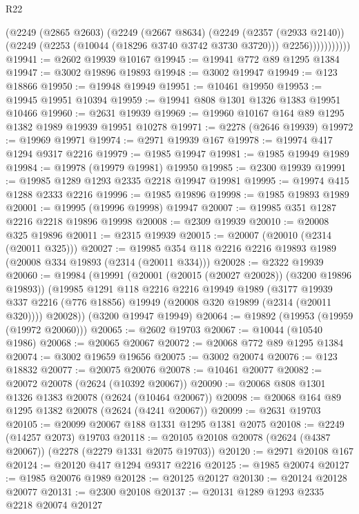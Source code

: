 \begin{lexlean}{R22}
\begin{coremodule}
                  (@2249
                    (@2865 @2603)
                    (@2249
                      (@2667 @8634)
                      (@2249
                        (@2357 (@2933 @2140))
                        (@2249 (@2253 (@10044 (@18296 @3740 @3742 @3730 @3720))) @2256)))))))))))
@19941 := @2602 @19939 @10167
@19945 := @19941 @772 @89 @1295 @1384
@19947 := @3002 @19896 @19893
@19948 := @3002 @19947
@19949 := @123 @18866
@19950 := @19948 @19949
@19951 := @10461 @19950
@19953 := @19945 @19951 @10394
@19959 := @19941 @808 @1301 @1326 @1383 @19951 @10466
@19960 := @2631 @19939
@19969 := @19960 @10167 @164 @89 @1295 @1382 @1989 @19939 @19951 @10278
@19971 := @2278 (@2646 @19939)
@19972 := @19969 @19971
@19974 := @2971 @19939 @167
@19978 := @19974 @417 @1294 @9317 @2216
@19979 := @1985 @19947
@19981 := @1985 @19949 @1989
@19984 := @19978 (@19979 @19981) @19950
@19985 := @2300 @19939
@19991 := @19985 @1289 @1293 @2335 @2218 @19947 @19981
@19995 := @19974 @415 @1288 @2333 @2216
@19996 := @1985 @19896
@19998 := @1985 @19893 @1989
@20001 := @19995 (@19996 @19998) @19947
@20007 := @19985 @351 @1287 @2216 @2218 @19896 @19998
@20008 := @2309 @19939
@20010 := @20008 @325 @19896
@20011 := @2315 @19939
@20015 := @20007 (@20010 (@2314 (@20011 @325)))
@20027 := @19985 @354 @118 @2216 @2216 @19893 @1989 (@20008 @334 @19893 (@2314 (@20011 @334)))
@20028 := @2322 @19939
@20060 := @19984
    (@19991
      (@20001 (@20015 (@20027 @20028)) (@3200 @19896 @19893))
      (@19985
        @1291
        @118
        @2216
        @2216
        @19949
        @1989
        (@3177 @19939 @337 @2216 (@776 @18856) @19949 (@20008 @320 @19899 (@2314 (@20011 @320))))
        @20028))
    (@3200 @19947 @19949)
@20064 := @19892 (@19953 (@19959 (@19972 @20060)))
@20065 := @2602 @19703
@20067 := @10044 (@10540 @1986)
@20068 := @20065 @20067
@20072 := @20068 @772 @89 @1295 @1384
@20074 := @3002 @19659 @19656
@20075 := @3002 @20074
@20076 := @123 @18832
@20077 := @20075 @20076
@20078 := @10461 @20077
@20082 := @20072 @20078 (@2624 (@10392 @20067))
@20090 := @20068 @808 @1301 @1326 @1383 @20078 (@2624 (@10464 @20067))
@20098 := @20068 @164 @89 @1295 @1382 @20078 (@2624 (@4241 @20067))
@20099 := @2631 @19703
@20105 := @20099 @20067 @188 @1331 @1295 @1381 @2075
@20108 := @2249 (@14257 @2073) @19703
@20118 := @20105 @20108 @20078 (@2624 (@4387 @20067)) (@2278 (@2279 @1331 @2075 @19703))
@20120 := @2971 @20108 @167
@20124 := @20120 @417 @1294 @9317 @2216
@20125 := @1985 @20074
@20127 := @1985 @20076 @1989
@20128 := @20125 @20127
@20130 := @20124 @20128 @20077
@20131 := @2300 @20108
@20137 := @20131 @1289 @1293 @2335 @2218 @20074 @20127

\end{coremodule}
\end{lexlean}
